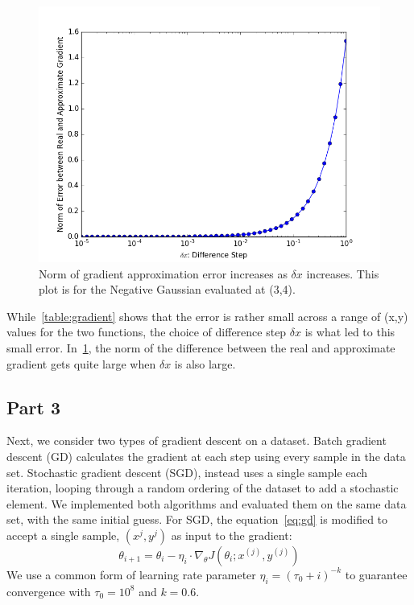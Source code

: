 \begin{figure}
	\centering
	\includegraphics [trim=0 0 0 0, clip, angle=0, width=0.8\columnwidth,
	keepaspectratio]{figures/1_2_error}
	\caption{Norm of gradient approximation error increases as $\delta x$ increases. This plot is for the Negative Gaussian evaluated at (3,4).} 
	\label{fig:1_2_error} 
\end{figure}

While~\cref{table:gradient} shows that the error is rather small across a range of (x,y) values for the two functions, the choice of difference step $\delta x$ is what led to this small error. In~\cref{fig:1_2_error}, the norm of the difference between the real and approximate gradient gets quite large when $\delta x$ is also large.


\subsection{Part 3}
Next, we consider two types of gradient descent on a dataset.
Batch gradient descent (GD) calculates the gradient at each step using every sample in the data set.
Stochastic gradient descent (SGD), instead uses a single sample each iteration, looping through a random ordering of the dataset to add a stochastic element.
We implemented both algorithms and evaluated them on the same data set, with the same initial guess.
For SGD, the equation~\cref{eq:gd} is modified to accept a single sample, $(x^j,y^j)$ as input to the gradient:
\begin{equation}
\theta_{i+1} = \theta_i - \eta_i \cdot \nabla_\theta J(\theta_i;x^{(j)},y^{(j)})
\label{eq:sgd}
\end{equation}
We use a common form of learning rate parameter $\eta_i = (\tau_0+i)^{-k}$ to guarantee convergence with $\tau_0=10^8$ and $k=0.6$.

